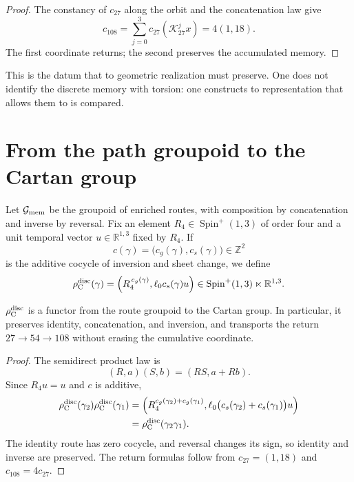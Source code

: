 \begin{proof}
The constancy of \(c_{27}\) along the orbit and the concatenation law give
\[
 c_{108}=\sum_{j=0}^{3}c_{27}(\mathcal K_{27}^jx)
 =4(1,18).
\]
The first coordinate returns; the second preserves the accumulated memory.
\end{proof}

This is the datum that to geometric realization must preserve.  One does not
identify the discrete memory with torsion: one constructs to representation
that allows them to is compared.

\section{From the path groupoid to the Cartan group}

Let \(\mathcal G_{\rm mem}\) be the groupoid of enriched routes, with
composition by concatenation and inverse by reversal. Fix an element
\(R_4\in\operatorname{Spin}^+(1,3)\) of order four and a unit temporal vector
\(u\in\mathbb R^{1,3}\) fixed by \(R_4\). If
\[
c(\gamma)=\bigl(c_g(\gamma),c_s(\gamma)\bigr)\in\mathbb Z^2
\]
is the additive cocycle of inversion and sheet change, we define
\[
\rho_{\rm C}^{\rm disc}(\gamma)
=
\left(
R_4^{\,c_g(\gamma)},
\ell_0c_s(\gamma)u
\right)
\in\operatorname{Spin}^+(1,3)\ltimes\mathbb R^{1,3}.
\]

\begin{theorem}
\label{thm:realizacion-discreta-cartan-rev6}
\(\rho_{\rm C}^{\rm disc}\) is a functor from the route groupoid to the
Cartan group. In particular, it preserves identity, concatenation, and inversion, and
transports the return \(27\to54\to108\) without erasing the cumulative coordinate.
\end{theorem}

\begin{proof}
The semidirect product law is
\[
(R,a)(S,b)=(RS,a+Rb).
\]
Since \(R_4u=u\) and \(c\) is additive,
\[
\begin{aligned}
\rho_{\rm C}^{\rm disc}(\gamma_2)
\rho_{\rm C}^{\rm disc}(\gamma_1)
&=
\left(
R_4^{c_g(\gamma_2)+c_g(\gamma_1)},
\ell_0\bigl(c_s(\gamma_2)+c_s(\gamma_1)\bigr)u
\right)\\
&=\rho_{\rm C}^{\rm disc}(\gamma_2\gamma_1).
\end{aligned}
\]
The identity route has zero cocycle, and reversal changes its sign, so
identity and inverse are preserved. The return formulas follow from
\(c_{27}=(1,18)\) and \(c_{108}=4c_{27}\).
\end{proof}


